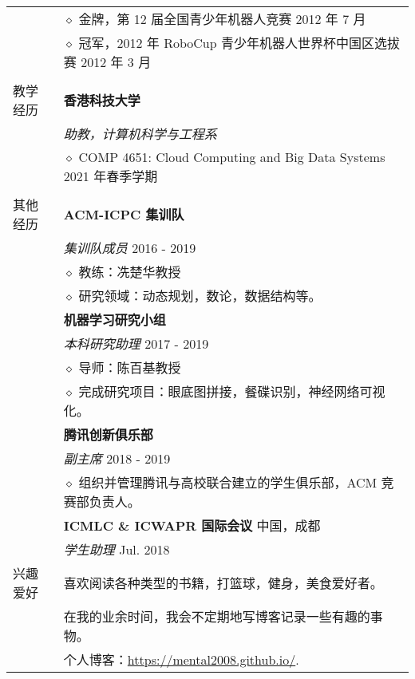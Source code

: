 \documentclass[letterpaper, 11pt]{article}
\begin{document}
\begin{longtable}{p{1.3in}p{4.8in}}
& $\diamond$ 金牌，第 12 届全国青少年机器人竞赛 \hfill 2012 年 7 月\\

& $\diamond$ 冠军，2012 年 RoboCup 青少年机器人世界杯中国区选拔赛 \hfill 2012 年 3 月 \\

& \\

{教学经历}
& \textbf{香港科技大学} \\
& \textit{助教，计算机科学与工程系} \\
& $\diamond$ COMP 4651: Cloud Computing and Big Data Systems \hfill 2021 年春季学期 \\
& \\

{其他经历}
& \textbf{ACM-ICPC 集训队} \\
& \textit{集训队成员} \hfill 2016 - 2019 \\
& $\diamond$ 教练：冼楚华教授 \\
& $\diamond$ 研究领域：动态规划，数论，数据结构等。 \\

& \textbf{机器学习研究小组} \\
& \textit{本科研究助理} \hfill 2017 - 2019 \\
& $\diamond$ 导师：陈百基教授 \\
& $\diamond$ 完成研究项目：眼底图拼接，餐碟识别，神经网络可视化。 \\

& \textbf{腾讯创新俱乐部} \\
& \textit{副主席} \hfill 2018 - 2019 \\
& $\diamond$ 组织并管理腾讯与高校联合建立的学生俱乐部，ACM 竞赛部负责人。 \\

& \textbf{ICMLC \& ICWAPR 国际会议} \hfill 中国，成都 \\
& \textit{学生助理} \hfill Jul. 2018 \\


\nohyphens{兴趣爱好}
& 喜欢阅读各种类型的书籍，打篮球，健身，美食爱好者。 \\
& 在我的业余时间，我会不定期地写博客记录一些有趣的事物。 \\
& 个人博客：\href{https://mental2008.github.io/}{https://mental2008.github.io/}. \\



\end{longtable}
\end{document}
